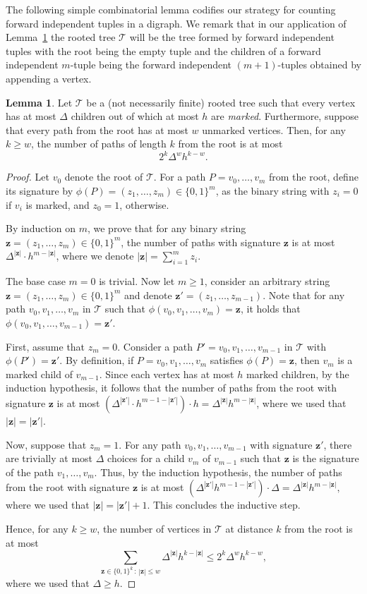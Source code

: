 \documentclass{article}
\theoremstyle{plain}
\newtheorem{lemma}[theorem]{Lemma}
\theoremstyle{definition}
\newtheorem{lemma}{Lemma}
\newcommand{\cT}{\mathcal{T}}
\newcommand{\bz}{\mathbf{z}}
\begin{document}
The following simple combinatorial lemma codifies our strategy for counting forward independent tuples in a digraph. We remark that in our application of Lemma~\ref{lem:tree-counting} the rooted tree $\cT$ will be the tree formed by forward independent tuples with the root being the empty tuple and the children of a forward independent $m$-tuple being the forward independent $(m+1)$-tuples obtained by appending a vertex.
\begin{lemma} \label{lem:tree-counting}
    Let $\cT$ be a (not necessarily finite) rooted tree such that every vertex has at most $\Delta$ children out of which at most $h$ are \emph{marked}. Furthermore, suppose that every path from the root has at most $w$ unmarked vertices. Then, for any $k \ge w$, the number of paths of length $k$ from the root is at most 
    \[ 2^k \Delta^w h^{k-w}. \] 
\end{lemma}
\begin{proof}
    Let $v_0$ denote the root of $\cT$. For a path $P = v_0, \dots, v_m$ from the root, define its signature by $\phi(P) = (z_1, \dots, z_m) \in \{0, 1\}^m$, as the binary string with $z_i = 0$ if $v_i$ is marked, and $z_0 = 1$, otherwise.
    
    By induction on $m$, we prove that for any binary string $\bz = (z_1, \dots, z_m) \in \{0, 1\}^m$, the number of paths with signature $\bz$ is at most $\Delta^{|\bz|} \cdot h^{m - |\bz|}$, where we denote $|\bz| = \sum_{i=1}^m z_i$.
    
    The base case $m = 0$ is trivial. Now let $m \ge 1$, consider an arbitrary string $\bz = (z_1, \dots, z_m) \in \{0, 1\}^m$ and denote $\bz' = (z_1, \dots, z_{m-1})$. Note that for any path $v_0, v_1, \dots, v_m$ in $\cT$ such that $\phi(v_0, v_1, \dots, v_m) = \bz$, it holds that $\phi(v_0, v_1, \dots, v_{m-1}) = \bz'$.

    First, assume that $z_m = 0$. Consider a path $P' = v_0, v_1,  \dots, v_{m-1}$ in $\cT$ with $\phi(P') = \bz'$. By definition, if $P = v_0, v_1, \dots, v_m$ satisfies $\phi(P) = \bz$, then $v_m$ is a marked child of $v_{m-1}$. Since each vertex has at most $h$ marked children, by the induction hypothesis, it follows that the number of paths from the root with signature $\bz$ is at most $( \Delta^{|\bz'|} \cdot h^{m-1 - |\bz'|} ) \cdot h = \Delta^{|\bz|} h^{m - |\bz|}$, where we used that $|\bz| = |\bz'|$.
    
    Now, suppose that $z_m=1$. For any path $v_0, v_1, \dots, v_{m-1}$ with signature $\bz'$, there are trivially at most $\Delta$ choices for a child $v_m$ of $v_{m-1}$ such that $\bz$ is the signature of the path $v_1, \dots, v_m$. Thus, by the induction hypothesis, the number of paths from the root with signature $\bz$ is at most $(\Delta^{|\bz'|} h^{m-1-|\bz'|}) \cdot \Delta = \Delta^{|\bz|} h^{m - |\bz|},$ where we used that $|\bz| = |\bz'| + 1$. This concludes the inductive step.

    Hence, for any $k \ge w$, the number of vertices in $\cT$ at distance $k$ from the root is at most 
    \[ \sum_{\bz \in \{0,1\}^k \, \colon \, |\bz| \le w} \Delta^{|\bz|} h^{k - |\bz|} \le 2^k \Delta^w h^{k-w}, \]
    where we used that $\Delta \ge h$.
\end{proof}
\end{document}
